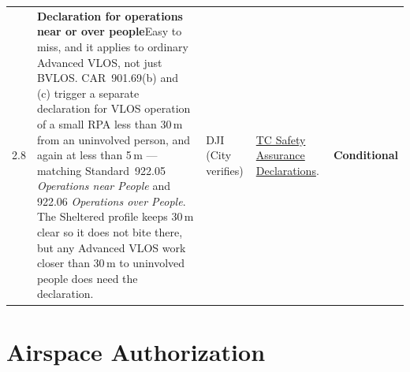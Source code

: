 \documentclass[11pt,letterpaper]{article}
\newcommand{\reqcell}[2]{\textbf{#1}\newline\small\color{uavgrey}#2}
\newcommand{\cond}{\textbf{\color{uavblue}Conditional}}
\begin{document}
\begin{longtable}{@{}L{0.28in} L{2.20in} L{0.85in} L{1.95in} L{0.85in}@{}}
2.8 &
\reqcell{Declaration for operations near or over people}{Easy to miss, and it applies to ordinary Advanced VLOS, not just BVLOS. CAR~901.69(b) and (c) trigger a separate declaration for VLOS operation of a small RPA less than 30\,m from an uninvolved person, and again at less than 5\,m --- matching Standard~922.05 \emph{Operations near People} and 922.06 \emph{Operations over People}. The Sheltered profile keeps 30\,m clear so it does not bite there, but any Advanced VLOS work closer than 30\,m to uninvolved people does need the declaration.} &
DJI (City verifies) &
\href{https://tc.canada.ca/en/aviation/drone-safety/submitting-drone-safety-assurance-declaration}{TC Safety Assurance Declarations}. &
\cond{} \\

\end{longtable}

\newpage

\section{Airspace Authorization}
\end{document}
